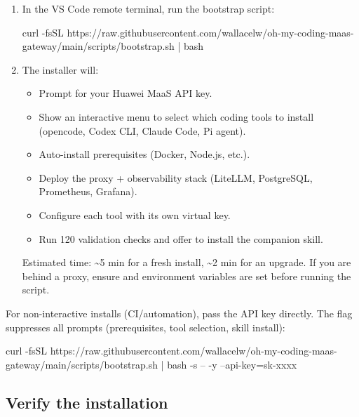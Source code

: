 \documentclass{guide}
\begin{document}
\stepbystep
\begin{enumerate}
  \item In the VS Code remote terminal, run the bootstrap script:

  \begin{code}[bash]
curl -fsSL https://raw.githubusercontent.com/wallacelw/oh-my-coding-maas-gateway/main/scripts/bootstrap.sh | bash
  \end{code}

  \item The installer will:
    \begin{itemize}
      \item Prompt for your Huawei MaaS API key.
      \item Show an interactive menu to select which coding tools to install
            (opencode, Codex CLI, Claude Code, Pi agent).
      \item Auto-install prerequisites (Docker, Node.js, etc.).
      \item Deploy the proxy + observability stack (LiteLLM, PostgreSQL,
            Prometheus, Grafana).
      \item Configure each tool with its own virtual key.
      \item Run 120 validation checks and offer to install the companion skill.
    \end{itemize}

  \begin{warning}
  Estimated time: \textasciitilde5 min for a fresh install, \textasciitilde2 min
  for an upgrade. If you are behind a proxy, ensure  and
   environment variables are set before running the script.
  \end{warning}
\end{enumerate}

\begin{tip}
For non-interactive installs (CI/automation), pass the API key directly. The
 flag suppresses all prompts (prerequisites, tool selection,
skill install):
\begin{code}
curl -fsSL https://raw.githubusercontent.com/wallacelw/oh-my-coding-maas-gateway/main/scripts/bootstrap.sh | bash -s -- -y --api-key=sk-xxxx
\end{code}
\end{tip}

\subsection{Verify the installation}
\end{document}
